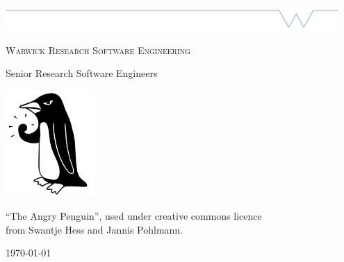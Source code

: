 \begin{titlepage}
	\centering
	\includegraphics[width=0.95\textwidth]{Warwick_A4_Bar}\par\vspace{1cm}
	{\scshape\LARGE Warwick Research Software Engineering \par}
	\vspace{1cm}
	{\huge\bfseries \newtitle \par}
	{\large\bfseries \newsubtitle \par}
	\vspace{2cm}
	{\Large\itshape \newauthor \par}
	Senior Research Software Engineers\par
	\vspace{3cm}
	\includegraphics[width=0.25\textwidth]{WarwickRSE}\par\vspace{1cm}
	{\scriptsize ``The Angry Penguin'', used under creative commons licence\\
from Swantje Hess and Jannis Pohlmann.}

	\vfill

	{\large \today\par}
\end{titlepage}